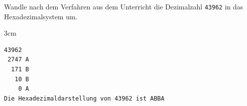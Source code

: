\question[3]
Wandle nach dem Verfahren aus dem Unterricht die Dezimalzahl \texttt{43962} in das Hexadezimalsystem um.
\begin{solutionbox}{3cm}
\begin{lstlisting}
43962 
 2747 A  
  171 B  
   10 B  
    0 A  
Die Hexadezimaldarstellung von 43962 ist ABBA
\end{lstlisting}
\end{solutionbox}
